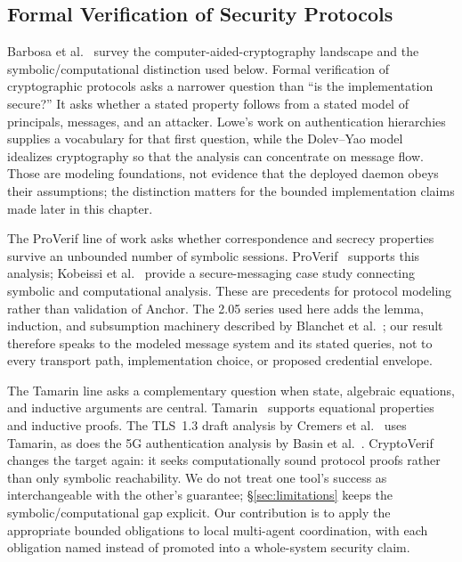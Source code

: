 \documentclass[11pt,a4paper]{article}
\theoremstyle{definition}
\begin{document}
\subsection{Formal Verification of Security Protocols}

Barbosa et al.~ survey the computer-aided-cryptography
landscape and the symbolic/computational distinction used below.
Formal verification of cryptographic protocols asks a narrower question than
``is the implementation secure?'' It asks whether a stated property follows
from a stated model of principals, messages, and an attacker. Lowe's work on
authentication hierarchies~ supplies a vocabulary for
that first question, while the Dolev--Yao model~
idealizes cryptography so that the analysis can concentrate on message flow.
Those are modeling foundations, not evidence that the deployed daemon obeys
their assumptions; the distinction matters for the bounded implementation
claims made later in this chapter.

The ProVerif line of work asks whether correspondence and secrecy properties
survive an unbounded number of symbolic sessions. ProVerif~
supports this analysis; Kobeissi et al.~ provide
a secure-messaging case study connecting symbolic and computational analysis.
These are precedents for protocol modeling rather than validation of Anchor. The
2.05 series used here adds the lemma, induction, and subsumption machinery
described by Blanchet et al.~; our result therefore
speaks to the modeled message system and its stated queries, not to every
transport path, implementation choice, or proposed credential envelope.

The Tamarin line asks a complementary question when state, algebraic
equations, and inductive arguments are central. Tamarin~
supports equational properties and inductive proofs. The TLS~1.3 draft analysis
by Cremers et al.~ uses Tamarin, as does the
5G authentication analysis by Basin et al.~.
CryptoVerif~ changes the target again:
it seeks computationally sound protocol proofs rather than only symbolic
reachability. We do not treat one tool's success as interchangeable with the
other's guarantee; \S\ref{sec:limitations} keeps the symbolic/computational
gap explicit. Our contribution is to apply the
appropriate bounded obligations to local multi-agent coordination, with each
obligation named instead of promoted into a whole-system security claim.
\end{document}
